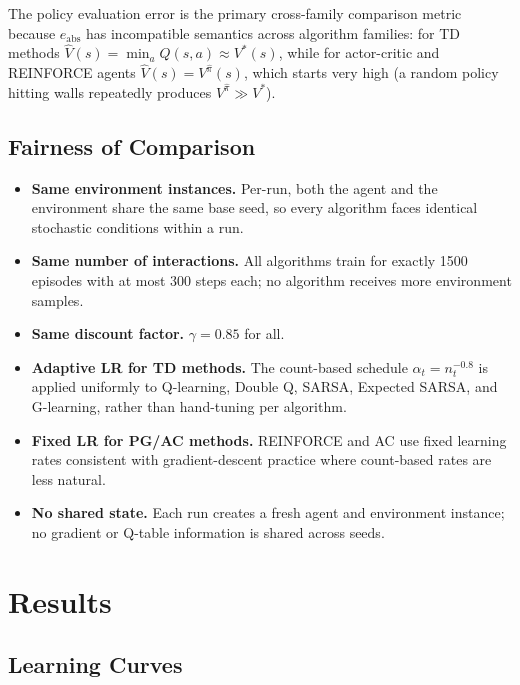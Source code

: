 \documentclass[11pt]{article}
\begin{document}
The policy evaluation error is the primary cross-family comparison metric
because $e_\text{abs}$ has incompatible semantics across algorithm families:
for TD methods $\hat{V}(s)=\min_a Q(s,a)\approx V^*(s)$, while for
actor-critic and REINFORCE agents $\hat{V}(s)=V^{\hat{\pi}}(s)$, which
starts very high (a random policy hitting walls repeatedly produces
$V^{\hat{\pi}}\gg V^*$).

\subsection{Fairness of Comparison}

\begin{itemize}[leftmargin=*]
    \item \textbf{Same environment instances.}  Per-run, both the agent and the
        environment share the same base seed, so every algorithm faces
        identical stochastic conditions within a run.
    \item \textbf{Same number of interactions.}  All algorithms train for
        exactly 1500 episodes with at most 300 steps each; no algorithm
        receives more environment samples.
    \item \textbf{Same discount factor.}  $\gamma=0.85$ for all.
    \item \textbf{Adaptive LR for TD methods.}  The count-based schedule
        $\alpha_t = n_t^{-0.8}$ is applied uniformly to Q-learning, Double Q,
        SARSA, Expected SARSA, and G-learning, rather than hand-tuning per
        algorithm.
    \item \textbf{Fixed LR for PG/AC methods.}  REINFORCE and AC use fixed
        learning rates consistent with gradient-descent practice where
        count-based rates are less natural.
    \item \textbf{No shared state.}  Each run creates a fresh agent and
        environment instance; no gradient or Q-table information is shared
        across seeds.
\end{itemize}

\section{Results}
\label{sec:results}

\subsection{Learning Curves}
\end{document}
